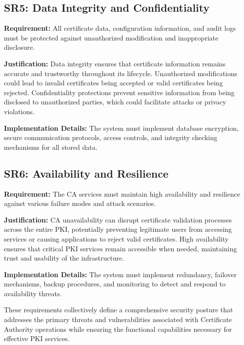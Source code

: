 \subsection{SR5: Data Integrity and Confidentiality}

\textbf{Requirement:} All certificate data, configuration information, and audit logs must be protected against unauthorized modification and inappropriate disclosure.

\textbf{Justification:} Data integrity ensures that certificate information remains accurate and trustworthy throughout its lifecycle. Unauthorized modifications could lead to invalid certificates being accepted or valid certificates being rejected. Confidentiality protections prevent sensitive information from being disclosed to unauthorized parties, which could facilitate attacks or privacy violations.

\textbf{Implementation Details:} The system must implement database encryption, secure communication protocols, access controls, and integrity checking mechanisms for all stored data.

\subsection{SR6: Availability and Resilience}

\textbf{Requirement:} The CA services must maintain high availability and resilience against various failure modes and attack scenarios.

\textbf{Justification:} CA unavailability can disrupt certificate validation processes across the entire PKI, potentially preventing legitimate users from accessing services or causing applications to reject valid certificates. High availability ensures that critical PKI services remain accessible when needed, maintaining trust and usability of the infrastructure.

\textbf{Implementation Details:} The system must implement redundancy, failover mechanisms, backup procedures, and monitoring to detect and respond to availability threats.

These requirements collectively define a comprehensive security posture that addresses the primary threats and vulnerabilities associated with Certificate Authority operations while ensuring the functional capabilities necessary for effective PKI services.